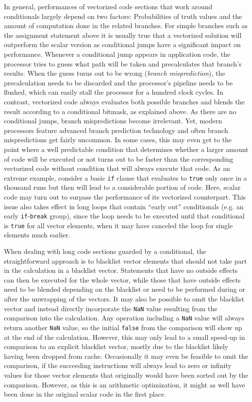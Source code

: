 In general, performances of vectorized code sections that work around conditionals largely depend on two factors: Probabilities of truth values and the amount of computation done in the related branches. For simple branches such as the assignment statement above it is usually true that a vectorized solution will outperform the scalar version as conditional jumps have a significant impact on performance. Whenever a conditional jump appears in application code, the processor tries to guess what path will be taken and precalculates that branch's results. When the guess turns out to be wrong (\emph{branch misprediction}), the precalculation needs to be discarded and the processor's pipeline needs to be flushed, which can easily stall the processor for a hundred clock cycles. In contrast, vectorized code always evaluates both possible branches and blends the result according to a conditional bitmask, as explained above. As there are no conditional jumps, branch mispredictions become irrelevant. Yet, modern processors feature advanced branch prediction technology and often branch mispredictions get fairly uncommon. In some cases, this may even get to the point where a well predictable condition that determines whether a larger amount of code will be executed or not turns out to be faster than the corresponding vectorized code without condition that will always execute that code. As an extreme example, consider a basic \texttt{if} clause that evaluates to \texttt{true} only once in a thousand runs but then will lead to a considerable portion of code. Here, scalar code may turn out to surpass the performance of its vectorized counterpart. This issue also takes effect in long loops that contain ``early out'' conditionals (e.g. an early \texttt{if}-\texttt{break} group), since the loop needs to be executed until that conditional is \texttt{true} for all vector elements, when it may have canceled the loop for single elements much earlier.

When dealing with long code sections guarded by a conditional, the straightforward approach is to blacklist vector elements that should not take part in the calculation in a blacklist vector. Statements that have no outside effects can then be executed for the whole vector, while those that have outside effects need to be blended depending on the blacklist or need to be performed during or after the unwrapping of the vectors. It may also be possible to omit the blacklist vector and instead directly incorporate the \texttt{NaN} value resulting from the comparison into the calculation. Any operation including a \texttt{NaN} value will always return another \texttt{NaN} value, so the initial \texttt{false} from the comparison will show up at the end of the calculation. However, this may only lead to a small speed-up in comparison to an explicit blacklist vector, mostly due to the blacklist likely having been dropped from cache. Occasionally it may even be feasible to omit the comparison, if the succeeding instructions will always lead to zero or infinity values for those vector elements that originally would have been sorted out by the comparison. However, as this is an arithmetic optimization, it might as well have been done in the original scalar code in the first place.

